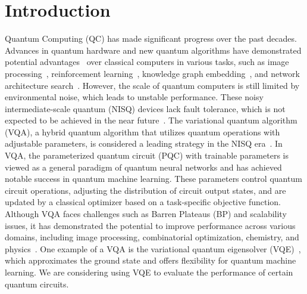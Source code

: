 \documentclass{article} %
\begin{document}
\section{Introduction}
Quantum Computing (QC) has made significant progress over the past decades. Advances in quantum hardware and new quantum algorithms have demonstrated potential advantages~\citep{stein2023benchmarking} over classical computers in various tasks, such as image processing~\citep{wang2022review}, reinforcement learning~\citep{skolik2022quantum}, knowledge graph embedding~\citep{ma2019variational}, and network architecture search~\citep{zhang2022differentiable, giovagnoli2023qneat, du2022quantum}. However, the scale of quantum computers is still limited by environmental noise, which leads to unstable performance. These noisy intermediate-scale quantum (NISQ) devices lack fault tolerance, which is not expected to be achieved in the near future~\citep{preskill2018quantum}. The variational quantum algorithm (VQA), a hybrid quantum algorithm that utilizes quantum operations with adjustable parameters, is considered a leading strategy in the NISQ era~\citep{cerezo2021variational}. In VQA, the parameterized quantum circuit (PQC) with trainable parameters is viewed as a general paradigm of quantum neural networks and has achieved notable success in quantum machine learning. These parameters control quantum circuit operations, adjusting the distribution of circuit output states, and are updated by a classical optimizer based on a task-specific objective function. Although VQA faces challenges such as Barren Plateaus (BP) and scalability issues, it has demonstrated the potential to improve performance across various domains, including image processing, combinatorial optimization, chemistry, and physics~\citep{9996795, Amaro_2022, tilly2022variational}. One example of a VQA is the variational quantum eigensolver (VQE)~\citep{peruzzo2014variational, tilly2022variational}, which approximates the ground state and offers flexibility for quantum machine learning. We are considering using VQE to evaluate the performance of certain quantum circuits.
\end{document}
